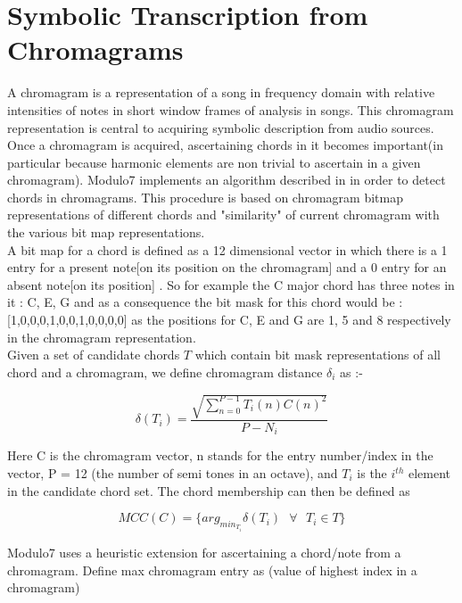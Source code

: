 \section{Symbolic Transcription from Chromagrams} \label{chromagramest}

\noindent A chromagram \cite{chromagramtutorial} is a representation of a song in frequency domain with relative intensities of notes in short window frames of analysis in songs. This chromagram representation is central to acquiring symbolic description from audio sources. Once a chromagram is acquired, ascertaining chords in it becomes important(in particular because harmonic elements are non trivial to ascertain in a given chromagram). Modulo7 implements an algorithm described in \cite{chord-detection} in order to detect chords in chromagrams. This procedure is based on chromagram bitmap representations of different chords and "similarity" of current chromagram with the various bit map representations. \\

\noindent A bit map for a chord is defined as a 12 dimensional vector in which there is a 1 entry for a present note[on its position on the chromagram] and a 0 entry for an absent note[on its position] \cite{chord-detection}. So for example the C major chord has three notes in it : C, E, G and as a consequence the bit mask for this chord would be : [1,0,0,0,1,0,0,1,0,0,0,0] as the positions for C, E and G are 1, 5 and 8 respectively in the chromagram representation. \\

\noindent Given a set of candidate chords $T$ which contain bit mask representations of all chord and a chromagram, we define chromagram distance $\delta_i$ as \cite{chord-detection}:-

\begin{equation}
\delta(T_i) = \frac{\sqrt{\sum_{n = 0}^{P - 1} T_i(n)C(n)^2}}{P - N_i}
\end{equation}

\noindent Here C is the chromagram vector, n stands for the entry number/index in the vector, P = 12 (the number of semi tones in an octave), and $T_i$ is the $i^{th}$ element in the candidate chord set. The chord membership can then be defined as 

\begin{equation}
MCC(C) = \{arg_{min_{T_i}} \delta (T_i) \ \ \ \forall \ \ \ T_i \in T \}
\end{equation}

\noindent Modulo7 uses a heuristic extension for ascertaining a chord/note from a chromagram. Define max chromagram entry as (value of highest index in a chromagram)

